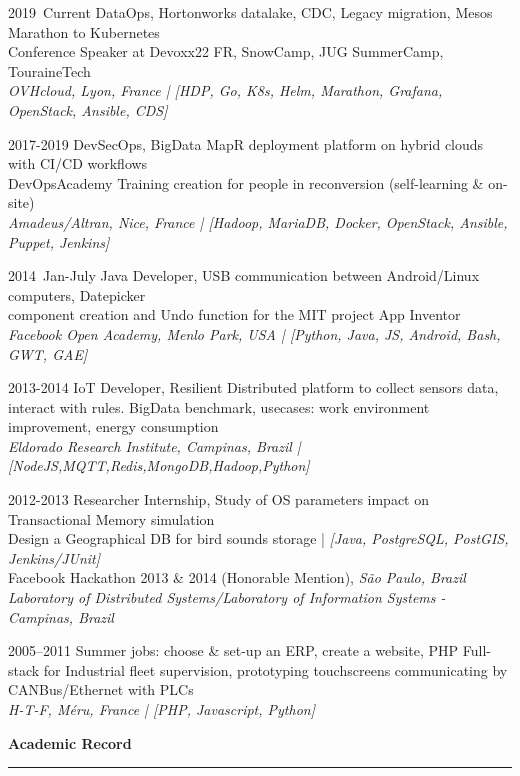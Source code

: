 \documentclass[11pt,british]{article}
\newcommand{\noun}[1]{\textsc{#1}}
\newenvironment{lyxlist}[1]
{\begin{list}{}
{\settowidth{\labelwidth}{#1}
 \setlength{\leftmargin}{\labelwidth}
 \addtolength{\leftmargin}{\labelsep}
 \renewcommand{\makelabel}[1]{##1\hfil}}}
{\end{list}}
\begin{document}
\begin{lyxlist}{0000.0000.000}
\item [{2019\noun{~}{\scriptsize{Current}}}] DataOps, Hortonworks datalake, CDC, Legacy migration, Mesos Marathon to Kubernetes\\
Conference Speaker at Devoxx22 FR, SnowCamp, JUG SummerCamp, TouraineTech\\
\emph{OVHcloud, Lyon, France | [HDP, Go, K8s, Helm, Marathon, Grafana, OpenStack, Ansible, CDS]}
\item [{\noun{2017-2019}}] DevSecOps, BigData MapR deployment platform on hybrid clouds with CI/CD workflows \\
DevOpsAcademy Training creation for people in reconversion (self-learning \& on-site) \\
\emph{Amadeus/Altran, Nice, France | [Hadoop, MariaDB, Docker, OpenStack, Ansible, Puppet, Jenkins]}
\item [{201\noun{4~}{\scriptsize{Jan-July}}}] Java Developer, USB communication between Android/Linux computers, Datepicker \\component creation and Undo function for the MIT project App Inventor\\
\emph{Facebook Open Academy, Menlo Park, USA | [Python, Java, JS, Android, Bash, GWT, GAE]}
\item [{\noun{2013-2014}}] IoT Developer, Resilient Distributed platform to collect sensors data, interact with rules. BigData benchmark, usecases: work environment improvement, energy consumption\\
\emph{Eldorado Research Institute, Campinas, Brazil | [NodeJS,MQTT,Redis,MongoDB,Hadoop,Python]}
\item [{\noun{2012-2013}}] \noindent Researcher Internship,
Study of OS parameters impact on Transactional Memory simulation \\
Design a Geographical DB for bird sounds storage | \emph{[Java, PostgreSQL, PostGIS, Jenkins/JUnit]} \\
Facebook Hackathon 2013 \& 2014 (Honorable Mention), \emph{São Paulo, Brazil}\\
\emph{Laboratory of Distributed Systems/Laboratory of Information Systems - Campinas, Brazil}
\item [{\noun{2005--2011}}]  Summer jobs: choose \& set-up an ERP, create a website, PHP Full-stack for Industrial fleet supervision, prototyping touchscreens communicating by CANBus/Ethernet with PLCs\\
\emph{H-T-F, Méru, France | [PHP, Javascript, Python]}

\end{lyxlist}
\textbf{Academic Record}\vspace{-8pt}
\\
\rule[0.5ex]{1\linewidth}{1pt}
\vspace{-24pt}
\end{document}
